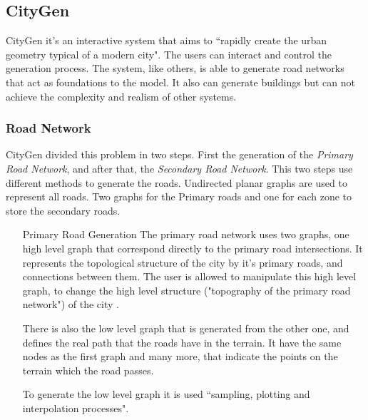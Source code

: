 
\subsection{CityGen } %
\label{sec:citygen}

CityGen \cite{Kelly2008} it's an interactive system that aims  to ``rapidly create the urban geometry typical of a modern city". The users can interact and control the generation process. The system, like others, is able to generate road networks that act as foundations to the model. It also can generate buildings but can not achieve the complexity and realism of other systems.

\subsubsection{Road Network} %
\label{ssub:road_network}

CityGen divided this problem in two steps. First the generation of the \emph{Primary Road Network}, and after that, the \emph{Secondary Road Network}. This two steps use different methods to generate the roads.
Undirected planar graphs are used to represent all roads. Two graphs for the Primary roads and one for each zone to store the secondary roads.

\begin{itemize}
	\item[Primary Road Generation] The primary road network uses two graphs, one high level graph that correspond directly to the primary road intersections. It represents the topological structure of the city by it's primary roads, and connections between them. The user is allowed to manipulate this high level graph, to change the high level structure ("topography of the primary road network") of the city .

There is also the low level graph that is generated from the other one, and defines the real path that the roads have in the terrain. It have the same nodes as the first graph and many more, that indicate the points on the terrain which the road passes.

To generate the low level graph it is used ``sampling, plotting and interpolation processes".
\end{itemize}

